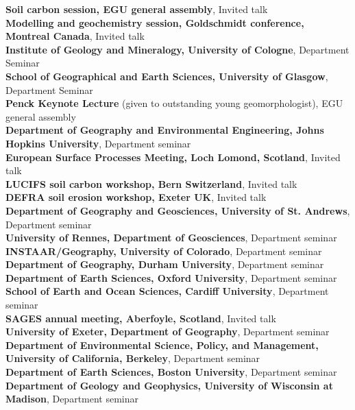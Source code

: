\documentclass[10pt, a4paper]{article}
\newcommand{\years}[1]{\marginnote{\scriptsize #1}}
\begin{document}
\years{2012}\textbf{Soil carbon session, EGU general assembly}, Invited talk\\[0.05cm]
\textbf{Modelling and geochemistry session, Goldschmidt conference, Montreal Canada}, Invited talk\\[0.05cm]
\textbf{Institute of Geology and Mineralogy, University of Cologne}, Department Seminar\\[0.05cm]
\textbf{School of Geographical and Earth Sciences, University of Glasgow}, Department Seminar\\[0.05cm]
\years{2011}\textbf{Penck Keynote Lecture} (given to outstanding young geomorphologist), EGU general assembly\\[0.05cm]
\textbf{Department of Geography and Environmental Engineering, Johns Hopkins University}, Department seminar\\[0.05cm]
\textbf{European Surface Processes Meeting, Loch Lomond, Scotland}, Invited talk\\[0.05cm]
\textbf{LUCIFS soil carbon workshop, Bern Switzerland}, Invited talk\\[0.05cm]
\textbf{DEFRA soil erosion workshop, Exeter UK}, Invited talk\\[0.05cm]
\years{2010}\textbf{Department of Geography and Geosciences, University of St. Andrews}, Department seminar\\[0.05cm]
\textbf{University of Rennes, Department of Geosciences}, Department seminar\\[0.05cm]
\years{2009}\textbf{INSTAAR/Geography, University of Colorado}, Department seminar\\[0.05cm]
\textbf{Department of Geography, Durham University}, Department seminar\\[0.05cm]
\textbf{Department of Earth Sciences, Oxford University}, Department seminar\\[0.05cm]
\textbf{School of Earth and Ocean Sciences, Cardiff University}, Department seminar\\[0.05cm]
\years{2008}\textbf{SAGES annual meeting, Aberfoyle, Scotland}, Invited talk\\[0.05cm]
\years{2007}\textbf{University of Exeter, Department of Geography}, Department seminar\\[0.05cm]
\years{2006}\textbf{Department of Environmental Science, Policy, and Management, University of California, Berkeley}, Department seminar\\[0.05cm]
\textbf{Department of Earth Sciences, Boston University}, Department seminar\\[0.05cm]
\textbf{Department of Geology and Geophysics, University of Wisconsin at Madison}, Department seminar\\[0.05cm]
\end{document}
